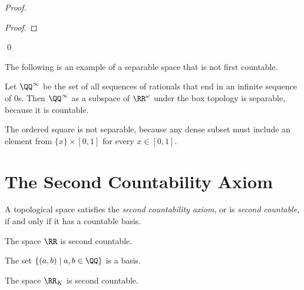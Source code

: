 \begin{proof}
    \pf
    \begin{proof}
    \end{proof}
    \qed
\end{proof}


The following is an example of a separable space that is not first countable.
\begin{example}[Choice]
    Let $\QQ^\infty$ be the set of all sequences of rationals that end in an
    infinite sequence of 0s. Then $\QQ^\infty$ as a subspace of $\RR^\omega$
    under the box topology is separable, because it is countable.
\end{example}

\begin{example}
    The ordered square is not separable, because any dense subset must include
    an element from $\{x\} \times [0,1]$ for every $x \in [0,1]$.
\end{example}

\section{The Second Countability Axiom}

\begin{definition}
    A topological space satisfies the \emph{second countability axiom},
    or is \emph{second countable}, if and only if it has a countable basis.    
\end{definition}

\begin{example}
    The space $\RR$ is second countable.

    The set $\{ (a,b) \mid a,b \in \QQ \}$ is a basis.
\end{example}

\begin{proposition}
    The space $\RR_K$ is second countable.
\end{proposition}

